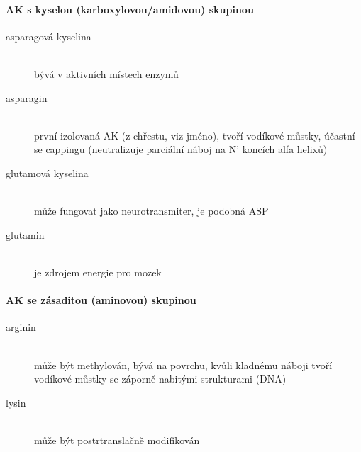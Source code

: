 \documentclass[DIV=8]{scrreprt}
\newcommand{\mybox}[2]{
    \paragraph{#1} #2
}
\begin{document}
\mybox{AK s kyselou (karboxylovou/amidovou) skupinou}{\begin{description}
\item[asparagová kyselina]\hfill \\
bývá v aktivních místech enzymů


\item[asparagin]\hfill \\
první izolovaná AK (z chřestu, viz jméno), tvoří vodíkové můstky, účastní se cappingu (neutralizuje parciální náboj na N' koncích alfa helixů)


\item[glutamová kyselina]\hfill \\
může fungovat jako neurotransmiter, je podobná ASP


\item[glutamin]\hfill \\
je zdrojem energie pro mozek

\end{description}
}


\mybox{AK se zásaditou (aminovou) skupinou}{\begin{description}
\item[arginin]\hfill \\
může být methylován, bývá na povrchu, kvůli kladnému náboji tvoří vodíkové můstky se záporně nabitými strukturami (DNA)


\item[lysin]\hfill \\
může být postrtranslačně modifikován

\end{description}
}
\end{document}
